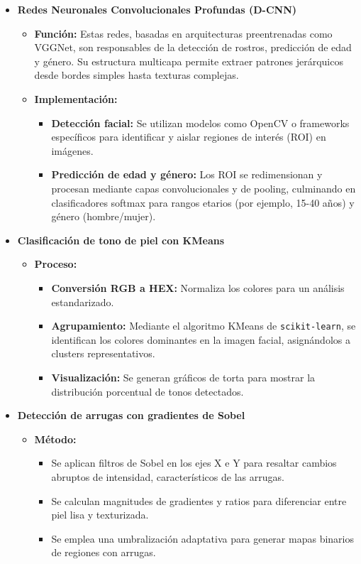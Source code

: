 \begin{itemize}
    \item \textbf{Redes Neuronales Convolucionales Profundas (D-CNN)}
	\begin{itemize}
		\item \textbf{Función:} Estas redes, basadas en arquitecturas preentrenadas como VGGNet, son responsables de la detección de rostros, predicción de edad y género. Su estructura multicapa permite extraer patrones jerárquicos desde bordes simples hasta texturas complejas.
		
		\item \textbf{Implementación:}
		\begin{itemize}
			\item \textbf{Detección facial:} Se utilizan modelos como OpenCV o frameworks específicos para identificar y aislar regiones de interés (ROI) en imágenes.
			\item \textbf{Predicción de edad y género:} Los ROI se redimensionan y procesan mediante capas convolucionales y de pooling, culminando en clasificadores softmax para rangos etarios (por ejemplo, 15-40 años) y género (hombre/mujer).
		\end{itemize}
	\end{itemize}
	
	\item \textbf{Clasificación de tono de piel con KMeans}
	\begin{itemize}
		\item \textbf{Proceso:}
		\begin{itemize}
			\item \textbf{Conversión RGB a HEX:} Normaliza los colores para un análisis estandarizado.
			\item \textbf{Agrupamiento:} Mediante el algoritmo KMeans de \texttt{scikit-learn}, se identifican los colores dominantes en la imagen facial, asignándolos a clusters representativos.
			\item \textbf{Visualización:} Se generan gráficos de torta para mostrar la distribución porcentual de tonos detectados.
		\end{itemize}
	\end{itemize}	

	\item \textbf{Detección de arrugas con gradientes de Sobel}
	\begin{itemize}
		\item \textbf{Método:}
		\begin{itemize}
			\item Se aplican filtros de Sobel en los ejes X e Y para resaltar cambios abruptos de intensidad, característicos de las arrugas.
			\item Se calculan magnitudes de gradientes y ratios para diferenciar entre piel lisa y texturizada.
			\item Se emplea una umbralización adaptativa para generar mapas binarios de regiones con arrugas.
		\end{itemize}
	\end{itemize}	

\end{itemize}



